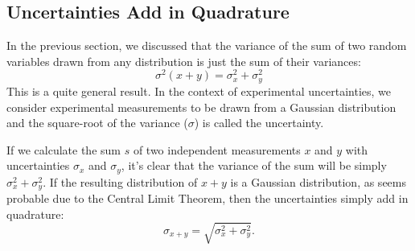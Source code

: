\documentclass[12pt]{article}
\begin{document}
\subsection{Uncertainties Add in Quadrature}

In the previous section, we discussed that the variance of the sum of two random variables drawn from any distribution is just the sum of their variances:
\begin{displaymath}
\sigma^2(x+y) = \sigma^2_x + \sigma^2_y
\end{displaymath}
This is a quite general result.  In the context of experimental uncertainties, we consider experimental measurements to be drawn from a Gaussian distribution and the square-root of the variance ($\sigma$) is called the uncertainty.

If we calculate the sum $s$ of two independent measurements $x$ and $y$ with uncertainties $\sigma_x$ and $\sigma_y$, it's clear that the variance of the sum will be simply $\sigma^2_x + \sigma^2_y$.  If the resulting distribution of $x+y$ is a Gaussian distribution, as seems probable due to the Central Limit Theorem, then the uncertainties simply add in quadrature:
\begin{displaymath}
\sigma_{x+y} = \sqrt{\sigma^2_x + \sigma^2_y}.
\end{displaymath}
\end{document}
